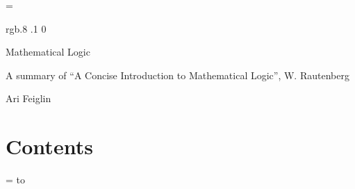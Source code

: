\def\qed{%
    \ifmmode \eqno\mathchar"404%
    \else%
        \hskip1cm\penalty0\null\nobreak\hfill$\mathchar"404$%
        \par\medskip%
    \fi%
}

%

\newcount\mlcount
\def\gentzen#1#2{%
    \,\vcenter{%
        \tabskip=.15cm\relax%
        \mlcount=1\relax%
        \offinterlineskip%
        \halign{\strut\hfil${##}$\hfil&&\global\advance\mlcount by 1\relax\vrule\kern.15cm${##}$\cr%
            #1\cr\noalign{\kern.1\jot\hrule\kern1\jot}%
            \multispan{\the\mlcount}\hfil$#2$\hfil\cr
        }%
    }\,%
}

\footline={}



\color rgb{.8 .1 0}

{\def\boxshadowcolor{rgb{.8 .8 0}}

    \centerline{Mathematical Logic}
    \smallskip
    \centerline{A summary of ``A Concise Introduction to Mathematical Logic'', W. Rautenberg}
    \centerline{Ari Feiglin}

\eppbox

\bigskip

\section*{Contents}

\tableofcontents
\eppbox

}

\vfill\break

\color{black}

\null
\vfill\break

\newif\ifpageodd
\pageoddtrue
\headline={%
    \hbox to \hsize{\color{black}%
        \ifpageodd\hfil{\it\currsubsection\quad\bf\folio}\global\pageoddfalse%
        \else{\bf\folio\quad\it\currsubsection}\hfil\global\pageoddtrue\fi%
    }%
}

